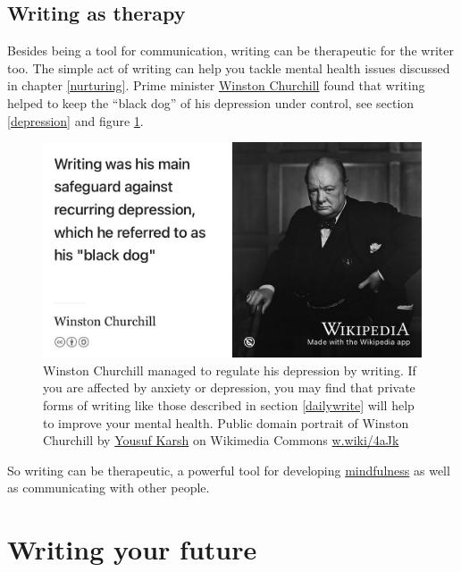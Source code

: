 \documentclass[
]{book}
\begin{document}
\hypertarget{therapy}{%
\subsection{Writing as therapy}\label{therapy}}

Besides being a tool for communication, writing can be therapeutic for the writer too. The simple act of writing can help you tackle mental health issues discussed in chapter \ref{nurturing}. Prime minister \href{https://en.wikipedia.org/wiki/Winston_Churchill}{Winston Churchill} found that writing helped to keep the ``black dog'' of his depression under control, see section \ref{depression} and figure \ref{fig:winston-fig}.

\begin{figure}

{\centering \includegraphics[width=1\linewidth]{images/churchill} 

}

\caption{Winston Churchill managed to regulate his depression by writing. If you are affected by anxiety or depression, you may find that private forms of writing like those described in section \ref{dailywrite} will help to improve your mental health. Public domain portrait of Winston Churchill by \href{https://en.wikipedia.org/wiki/Yousuf_Karsh}{Yousuf Karsh} on Wikimedia Commons \href{https://w.wiki/4aJk}{w.wiki/4aJk}}\label{fig:winston-fig}
\end{figure}



So writing can be therapeutic, a powerful tool for developing \href{https://www.nhs.uk/mental-health/self-help/tips-and-support/mindfulness/}{mindfulness} as well as communicating with other people.

\hypertarget{wyf}{%
\section{Writing your future}\label{wyf}}
\end{document}
